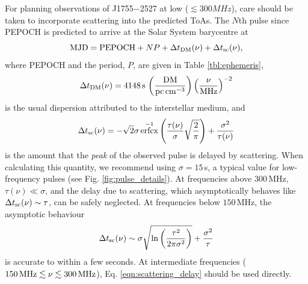 \documentclass[fleqn,usenatbib]{mnras}
\newcommand{\src}{J1755$-$2527}
\DeclareMathOperator{\erfcx}{erfcx}
\begin{document}
For planning observations of \src{} at low ($\lesssim 300 MHz$), care should be taken to incorporate scattering into the predicted ToAs.
The $N$th pulse since PEPOCH is predicted to arrive at the Solar System barycentre at
\begin{equation}
    {\rm MJD} = {\rm PEPOCH} + NP + \Delta t_{\rm DM}(\nu) + \Delta t_{\rm sc}(\nu),
\end{equation}
where PEPOCH and the period, $P$, are given in Table \ref{tbl:ephemeris},
\begin{equation}
    \Delta t_{\rm DM}(\nu) = 4148\,{\rm s} \, \left(\frac{\rm DM}{{\rm pc\,cm}^{-3}}\right) \left(\frac{\nu}{\rm MHz}\right)^{-2}
\end{equation}
is the usual dispersion attributed to the interstellar medium, and
\begin{equation}
    \Delta t_{\rm sc}(\nu) = -\sqrt{2}\sigma\erfcx^{-1}\left(\frac{\tau(\nu)}{\sigma}\sqrt{\frac{2}{\pi}}\right) + \frac{\sigma^2}{\tau(\nu)}
    \label{eqn:scattering_delay}
\end{equation}
is the amount that the \emph{peak} of the observed pulse is delayed by scattering.
When calculating this quantity, we recommend using $\sigma = 15\,$s, a typical value for low-frequency pulses (see Fig. \ref{fig:pulse_details}).
At frequencies above $300\,$MHz, $\tau(\nu) \ll \sigma$, and the delay due to scattering, which asymptotically behaves like $\Delta t_{\rm sc}(\nu) \sim \tau$, can be safely neglected.
At frequencies below $150\,$MHz, the asymptotic behaviour
\begin{equation}
    \Delta t_{\rm sc}(\nu) \sim \sigma \sqrt{\ln \left(\frac{\tau^2}{2\pi \sigma^2}\right)} + \frac{\sigma^2}{\tau}
\end{equation}
is accurate to within a few seconds.
At intermediate frequencies ($150\,{\rm MHz} \lesssim \nu \lesssim 300\,{\rm MHz}$), Eq. \eqref{eqn:scattering_delay} should be used directly.

\end{document}
